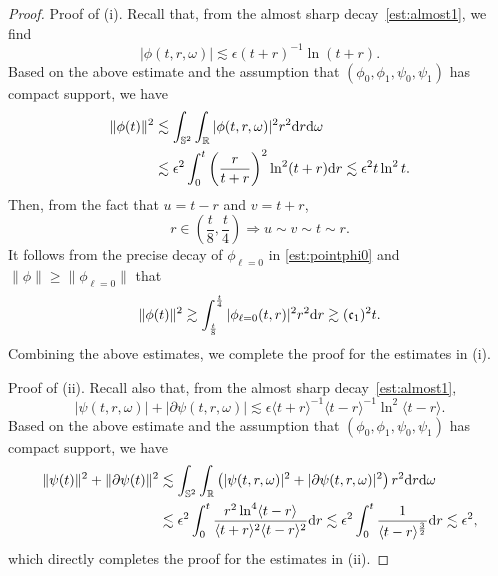 \documentclass[a4paper,reqno]{amsart}
\theoremstyle{definition}
\numberwithin{equation}{section}
\def \R {{\mathbb{R} }}
\def \d {{\rm{d}}}
\def\cfrak{\mathfrak{c}}
\begin{document}
\begin{proof}
    Proof of (i). Recall that, from the almost sharp decay~\eqref{est:almost1}, we find 
    \begin{equation*}
        |\phi(t,r,\omega)|\lesssim \epsilon (t+r)^{-1}\ln (t+r).
    \end{equation*}
    Based on the above estimate and the assumption that $(\phi_{0},\phi_{1},\psi_{0},\psi_{1})$ has compact support, we have
    \begin{equation*}
    \begin{aligned}
        \|\phi(t)\|^{2}
        &\lesssim \int_{\mathbb{S}^{2}}\int_{\R}|\phi(t,r,\omega)|^{2}r^{2}\d r\d \omega\\
        &\lesssim \epsilon^{2}\int_{0}^{t} \left(\frac{r}{t+r}\right)^{2}\ln^{2}(t+r)\d r\lesssim 
        \epsilon^{2}t \ln^{2}t.
        \end{aligned}
    \end{equation*}
    Then, from the fact that $u=t-r$ and $v=t+r$,
    \begin{equation*}
        r\in \left(\frac{t}{8},\frac{t}{4}\right)\Longrightarrow u\sim v\sim t\sim r.
    \end{equation*}
    It follows from the precise decay of $\phi_{\ell=0}$ in \eqref{est:pointphi0} and $\|\phi\| \geq \|\phi_{\ell=0}\|$ that 
    \begin{equation*}
        \|\phi(t)\|^{2}\gtrsim \int_{\frac{t}{8}}^{\frac{t}{4}}|\phi_{\ell=0}(t,r)|^{2}r^{2}\d r\gtrsim (\cfrak_1)^2t.
    \end{equation*}
    Combining the above estimates, we complete the proof for the estimates in (i).

    \smallskip
    Proof of (ii). Recall also that, from the almost sharp decay~\eqref{est:almost1},
    \begin{equation*}
        |\psi(t,r,\omega)|+|\partial \psi(t,r,\omega)|\lesssim \epsilon \langle t+r\rangle^{-1}\langle t-r\rangle^{-1}\ln^{2}\langle t-r\rangle.
    \end{equation*}
    Based on the above estimate and the assumption that  $(\phi_{0},\phi_{1},\psi_{0},\psi_{1})$ has compact support, we have
    \begin{equation*}
        \begin{aligned}
        \|\psi(t)\|^{2}+\|\partial\psi(t)\|^{2}
        &\lesssim \int_{\mathbb{S}^{2}}\int_{\R}
        \left(
        |\psi(t,r,\omega)|^{2}
        +|\partial \psi(t,r,\omega)|^{2}
        \right)r^{2}\d r\d \omega\\
        &\lesssim \epsilon^{2}\int_{0}^{t} \frac{r^{2}\ln^{4}\langle t-r\rangle}{\langle t+r\rangle^{2}\langle t-r\rangle^{2}}\d r
        \lesssim \epsilon^2\int_{0}^{t}\frac{1}{\langle t-r\rangle^{\frac{3}{2}}}\d r
        \lesssim 
        \epsilon^{2},
        \end{aligned}
    \end{equation*}
    which directly completes the proof for the estimates in (ii).
\end{proof}
\end{document}
